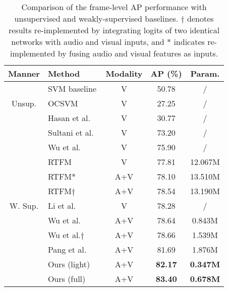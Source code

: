 \documentclass[sigconf]{acmart}
\begin{document}
\begin{table}[tb]
\caption{Comparison of the frame-level AP performance with unsupervised and weakly-supervised baselines. $\dagger$ denotes results re-implemented by integrating logits of two identical networks with audio and visual inputs, and * indicates re-implemented by fusing audio and visual features as inputs.}
\begin{tabular}{@{}clccc@{}}
\toprule
 Manner                            & Method                                            & Modality       & AP (\%)        & Param.       \\ \midrule
\multirow{3}{*}{Unsup.}            & SVM baseline                                      & V              & 50.78          &   /           \\
                                   & OCSVM~\cite{scholkopf1999support}                 & V              & 27.25          &   /           \\
                                   & Hasan et al.~\cite{hasan2016learning}             & V              & 30.77          &   /           \\ \midrule
\multirow{11}{*}{W. Sup.}          & Sultani et al.~\cite{sultani2018real}             & V              & 73.20          &   /          \\
                                   & Wu et al.~\cite{wu2021learning}                   & V              & 75.90          &   /           \\
                                   & RTFM~\cite{tian2021weakly}                        & V              & 77.81          &  12.067M            \\
                                   & RTFM*~\cite{tian2021weakly}                       & A+V            & 78.10          &  13.510M            \\
                                   & RTFM$\dagger$~\cite{tian2021weakly}               & A+V            & 78.54          &  13.190M           \\ 
                                   & Li et al.~\cite{li2022self}                       & V              & 78.28          &  /            \\
                                   & Wu et al.~\cite{wu2020not}                        & A+V            & 78.64          &  0.843M      \\
                                   & Wu et al.$\dagger$~\cite{wu2020not}               & A+V            & 78.66          &  1.539M      \\
                                   & Pang et al.~\cite{pang2021violence}               & A+V            & 81.69          &  1.876M      \\ \cmidrule(l){2-5} 
                                   & Ours (light)                                      & A+V            & \textbf{82.17} &  \textbf{0.347M}      \\ 
                                   & Ours (full)                                       & A+V            & \textbf{83.40} &  \textbf{0.678M}      \\ \bottomrule
\end{tabular}
\label{exp:table1}
\end{table}
\end{document}
